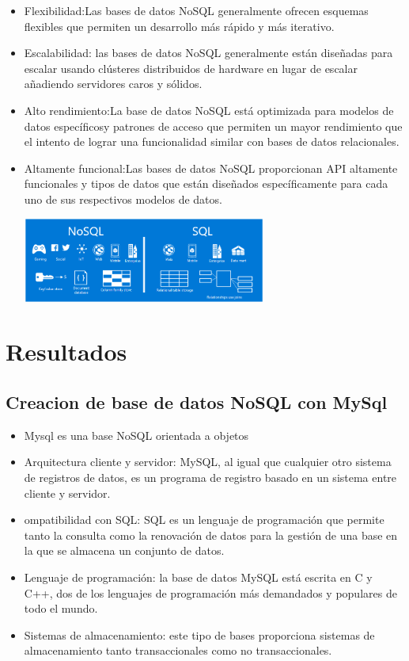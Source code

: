 \documentclass[%
 reprint,
 amsmath,amssymb,
 aps,
]{revtex4-1}
\begin{document}
	           \begin{itemize}
		\item Flexibilidad:Las bases de datos NoSQL generalmente ofrecen esquemas flexibles que permiten un desarrollo más rápido y más iterativo. 
                     \item Escalabilidad: las bases de datos NoSQL generalmente están diseñadas para escalar usando clústeres distribuidos de hardware en lugar de escalar añadiendo servidores caros y sólidos. 
		\item Alto rendimiento:La base de datos NoSQL está optimizada para modelos de datos específicosy patrones de acceso que permiten un mayor rendimiento que el intento de lograr una funcionalidad similar con bases de datos relacionales.
		\item Altamente funcional:Las bases de datos NoSQL proporcionan API altamente funcionales y tipos de datos que están diseñados específicamente para cada uno de sus respectivos modelos de datos.
                     \begin{center}
		\includegraphics[width=8cm]{./Imagenes/3}
		\end{center}	
	          \end{itemize}
\section {Resultados}\label{sec:4}
\subsection{Creacion de base de datos NoSQL con MySql}
                     \begin{itemize}
		\item Mysql es una base NoSQL orientada a objetos
		\item Arquitectura cliente y servidor: MySQL, al igual que cualquier otro sistema de registros de datos, es un programa de registro basado en un sistema entre cliente y servidor.
		\item ompatibilidad con SQL: SQL es un lenguaje de programación que permite tanto la consulta como la renovación de datos para la gestión de una base en la que se almacena un conjunto de datos.
                     \item Lenguaje de programación: la base de datos MySQL está escrita en C y C++, dos de los lenguajes de programación más demandados y populares de todo el mundo.
                     \item Sistemas de almacenamiento: este tipo de bases proporciona sistemas de almacenamiento tanto transaccionales como no transaccionales.
                     \end{itemize}
\end{document}
